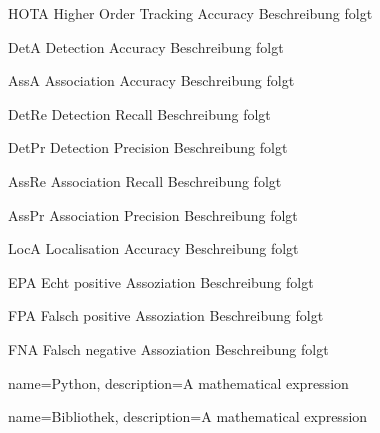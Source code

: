 \newglossaryentrywithacronym
{HOTA}
{Higher Order Tracking Accuracy}
{Beschreibung folgt}

\newglossaryentrywithacronym
{DetA}
{Detection Accuracy}
{Beschreibung folgt}

\newglossaryentrywithacronym
{AssA}
{Association Accuracy}
{Beschreibung folgt}

\newglossaryentrywithacronym
{DetRe}
{Detection Recall}
{Beschreibung folgt}

\newglossaryentrywithacronym
{DetPr}
{Detection Precision}
{Beschreibung folgt}

\newglossaryentrywithacronym
{AssRe}
{Association Recall}
{Beschreibung folgt}

\newglossaryentrywithacronym
{AssPr}
{Association Precision}
{Beschreibung folgt}

\newglossaryentrywithacronym
{LocA}
{Localisation Accuracy}
{Beschreibung folgt}

\newglossaryentrywithacronym
{EPA}
{Echt positive Assoziation}
{Beschreibung folgt}

\newglossaryentrywithacronym
{FPA}
{Falsch positive Assoziation}
{Beschreibung folgt}

\newglossaryentrywithacronym
{FNA}
{Falsch negative Assoziation}
{Beschreibung folgt}


{
        name=Python,
        description={A mathematical expression}
}

{
        name=Bibliothek,
        description={A mathematical expression}
}






